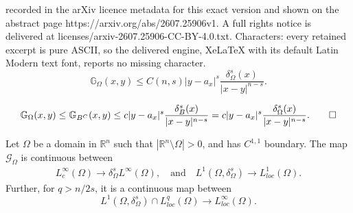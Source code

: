 \documentclass[10pt,a4paper]{amsart}
\newcommand{\R}{\mathbb{R}}
\newcommand{\g}[1]{\mathcal{G}_{#1}}
\newcommand{\gk}[1]{\mathbb{G}_{#1}}
\begin{document}
recorded in the arXiv licence metadata for this exact version and shown on the abstract page https://arxiv.org/abs/2607.25906v1. A full rights notice is delivered at licenses/arxiv-2607.25906-CC-BY-4.0.txt. Characters: every retained excerpt is pure ASCII, so the delivered engine, XeLaTeX with its default Latin Modern text font, reports no missing character.
\begin{equation}\label{eqn greens estimatte on unbounded domain}
    \gk{\Omega}(x,y)\leq C(n,s)|y-a_x|^{s}\frac{\delta_{\Omega}^{s}(x)}{|x-y|^{n-s}}.
\end{equation}

   \begin{equation}\label{eqn behaviour of greens on unbounded domains}
           \gk{\Omega}(x,y)\leq \gk{B^{C}}(x,y) \leq c|y-a_x|^{s}\frac{\delta_{B}^{s}(x)}{|x-y|^{n-s}}=c|y-a_x|^{s}\frac{\delta_{\Omega}^{s}(x)}{|x-y|^{n-s}}. \qedhere
   \end{equation}

\begin{theorem}\label{theorem greens poteantial continuity on unbounded domains}
    Let $\Omega$ be a domain in $\R^{n}$ such that $|\R^{n}\setminus \Omega|>0$, and has $C^{1,1}$ boundary. The map $\g{\Omega}$ is continuous between
    \begin{equation*}
    \begin{split}
        L^{\infty}_{c}(\Omega)\to \delta_{\Omega}^{s}L^{\infty}(\Omega),\quad \text{and} \quad L^{1}(\Omega,\delta_{\Omega}^{s})\to L_{loc}^{1}(\Omega). 
    \end{split}    
    \end{equation*}
Further, for $q>n/2s$, it is a continuous map between 
\begin{equation*}
    L^{1}(\Omega,\delta_{\Omega}^{s})\cap L_{loc}^{q}(\Omega)\to L^{\infty}_{loc}(\Omega).
\end{equation*}
\end{theorem}
\end{document}
